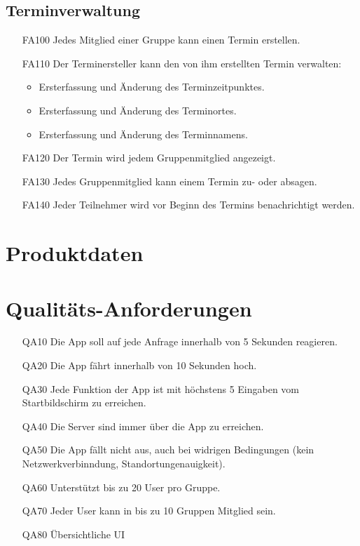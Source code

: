\documentclass{scrartcl}
\begin{document}
		\subsection{Terminverwaltung}
		\begin{itemize}
		\item[FA100] Jedes Mitglied einer Gruppe kann einen Termin erstellen.
		\item[FA110] Der Terminersteller kann den von ihm erstellten Termin verwalten:
			\begin{itemize}
			\item Ersterfassung und Änderung des Terminzeitpunktes.
			\end{itemize}
			\begin{itemize}
			\item Ersterfassung und Änderung des Terminortes.
			\end{itemize}
			\begin{itemize}
			\item Ersterfassung und Änderung des Terminnamens.
			\end{itemize}
			
		\item[FA120] Der Termin wird jedem Gruppenmitglied angezeigt.
		\item[FA130] Jedes Gruppenmitglied kann einem Termin zu- oder absagen.
		\item[FA140] Jeder Teilnehmer wird vor Beginn des Termins benachrichtigt werden.
		
		\end{itemize}
		
		
		
		
	\newpage


	\section{Produktdaten}

	\newpage


	\section{Qualitäts-Anforderungen}
	\begin{itemize}[nosep] 
	\item[QA10] Die App soll auf jede Anfrage innerhalb von 5 Sekunden reagieren.
	\item[QA20] Die App fährt innerhalb von 10 Sekunden hoch.
	\item[QA30] Jede Funktion der App ist mit höchstens 5 Eingaben vom Startbildschirm zu erreichen.
	\item[QA40] Die Server sind immer über die App zu erreichen.
	\item[QA50] Die App fällt nicht aus, auch bei widrigen Bedingungen (kein Netzwerkverbinndung, Standortungenauigkeit).
	\item[QA60] Unterstützt bis zu 20 User pro Gruppe.
	\item[QA70] Jeder User kann in bis zu 10 Gruppen Mitglied sein.
	\item[QA80] Übersichtliche UI
	\end{itemize}
\end{document}
